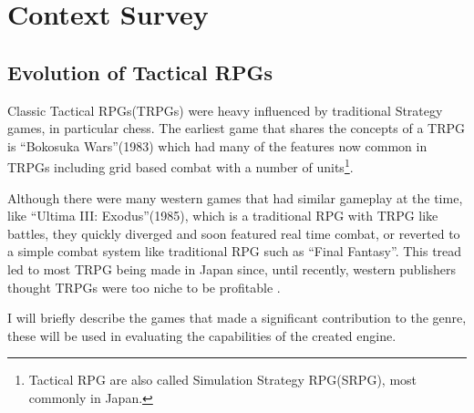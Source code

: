 
\section{Context Survey} 
\label{Context_Survey}

\subsection{Evolution of Tactical RPGs }
\label{sub:evolution_of_tactical_rpgs_}

Classic Tactical RPGs(TRPGs)  were heavy influenced by traditional Strategy games, in particular chess.  The earliest game that shares the concepts of a TRPG is ``Bokosuka Wars''(1983) which had many of the features now common in TRPGs including grid based combat with a number of units\cite{BokosukaWars}\footnote{Tactical RPG are also called Simulation Strategy RPG(SRPG),  most commonly in Japan.}. 

Although there were many western games that had similar gameplay at the time, like ``Ultima III: Exodus''(1985), which is a traditional RPG with TRPG like battles, they quickly diverged and soon featured real time combat, or reverted to a simple combat system like traditional RPG such as ``Final Fantasy''.  This tread led to most TRPG being made in Japan since, until recently, western publishers  thought TRPGs were too niche to be profitable \cite{notrpg}. 

I will briefly describe  the games that made a significant contribution to the genre, these will be used in evaluating the capabilities of the created engine.

